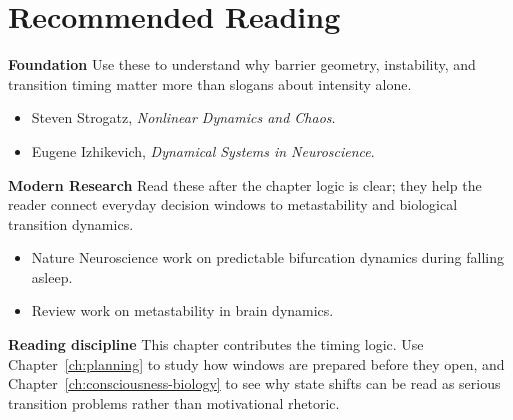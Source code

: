 \section{Recommended Reading}

\begin{readingbox}
\textbf{Foundation} Use these to understand why barrier geometry, instability,
and transition timing matter more than slogans about intensity alone.
\begin{itemize}[nosep]
  \item Steven Strogatz, \emph{Nonlinear Dynamics and Chaos}.
  \item Eugene Izhikevich, \emph{Dynamical Systems in Neuroscience}.
\end{itemize}
\textbf{Modern Research} Read these after the chapter logic is clear; they help
the reader connect everyday decision windows to metastability and biological
transition dynamics.
\begin{itemize}[nosep]
  \item Nature Neuroscience work on predictable bifurcation dynamics during
        falling asleep.
  \item Review work on metastability in brain dynamics.
\end{itemize}
\textbf{Reading discipline} This chapter contributes the timing logic. Use
Chapter~\ref{ch:planning} to study how windows are prepared before they open,
and Chapter~\ref{ch:consciousness-biology} to see why state shifts can be read
as serious transition problems rather than motivational rhetoric.
\end{readingbox}
